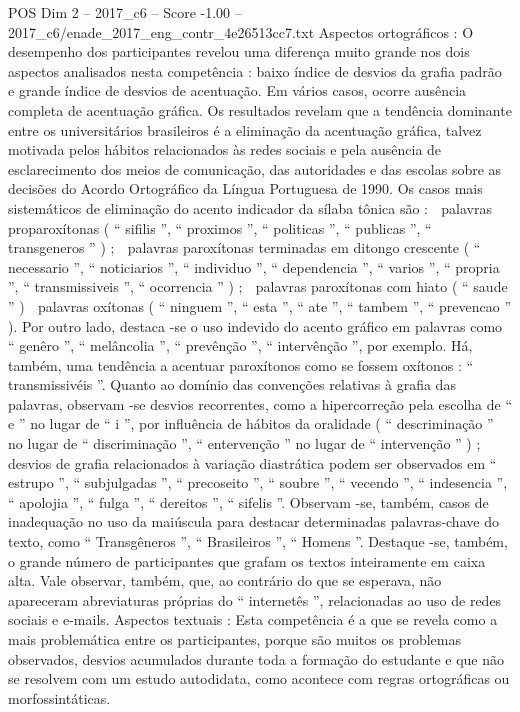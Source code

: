 \begin{textsample}{POS Dim 2 – 2017\_c6 – Score -1.00 – 2017\_c6/enade\_2017\_eng\_contr\_4e26513cc7.txt}
Aspectos ortográficos : O desempenho dos participantes revelou uma diferença muito grande nos dois aspectos analisados nesta competência : baixo índice de desvios da grafia padrão e grande índice de desvios de acentuação.
Em vários casos, ocorre ausência completa de acentuação gráfica.
Os resultados revelam que a tendência dominante entre os universitários brasileiros é a eliminação da acentuação gráfica, talvez motivada pelos hábitos relacionados às redes sociais e pela ausência de esclarecimento dos meios de comunicação, das autoridades e das escolas sobre as decisões do Acordo Ortográfico da Língua Portuguesa de 1990.
Os casos mais sistemáticos de eliminação do acento indicador da sílaba tônica são :  palavras proparoxítonas ( “ sifilis ”, “ proximos ”, “ politicas ”, “ publicas ”, “ transgeneros ” ) ;  palavras paroxítonas terminadas em ditongo crescente ( “ necessario ”, “ noticiarios ”, “ individuo ”, “ dependencia ”, “ varios ”, “ propria ”, “ transmissiveis ”, “ ocorrencia ” ) ;  palavras paroxítonas com hiato ( “ saude ” )  palavras oxítonas ( “ ninguem ”, “ esta ”, “ ate ”, “ tambem ”, “ prevencao ” ).
Por outro lado, destaca -se o uso indevido do acento gráfico em palavras como “ genêro ”, “ melâncolia ”, “ prevênção ”, “ intervênção ”, por exemplo.
Há, também, uma tendência a acentuar paroxítonos como se fossem oxítonos : “ transmissivéis ”.
Quanto ao domínio das convenções relativas à grafia das palavras, observam -se desvios recorrentes, como a hipercorreção pela escolha de “ e ” no lugar de “ i ”, por influência de hábitos da oralidade ( “ descriminação ” no lugar de “ discriminação ”, “ entervenção ” no lugar de “ intervenção ” ) ; desvios de grafia relacionados à variação diastrática podem ser observados em “ estrupo ”, “ subjulgadas ”, “ precoseito ”, “ soubre ”, “ vecendo ”, “ indesencia ”, “ apolojia ”, “ fulga ”, “ dereitos ”, “ sifelis ”.
Observam -se, também, casos de inadequação no uso da maiúscula para destacar determinadas palavras-chave do texto, como “ Transgêneros ”, “ Brasileiros ”, “ Homens ”.
Destaque -se, também, o grande número de participantes que grafam os textos inteiramente em caixa alta.
Vale observar, também, que, ao contrário do que se esperava, não apareceram abreviaturas próprias do “ internetês ”, relacionadas ao uso de redes sociais e e-mails.
Aspectos textuais : Esta competência é a que se revela como a mais problemática entre os participantes, porque são muitos os problemas observados, desvios acumulados durante toda a formação do estudante e que não se resolvem com um estudo autodidata, como acontece com regras ortográficas ou morfossintáticas.

\end{textsample}
